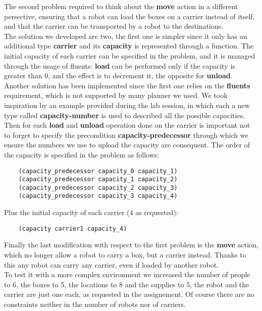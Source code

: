The second problem required to think about the \textbf{move} action in a different persective, 
ensuring that a robot can load the boxes on a carrier instead of itself, and that the carrier can be transported by a robot to the destinations.\\
The solution we developed are two, the first one is simpler since it only has an additional type \textbf{carrier} and its \textbf{capacity} is represented through a function.
The initial capacity of each carrier can be specified in the problem, and it is managed through the usage of fluents: \textbf{load} can be performed only if the capacity is greater than 0, and the effect is to decrement it, the opposite for \textbf{unload}.\\
Another solution has been implemented since the first one relies on the \textbf{fluents} requirement, which is not supported by many planner we used.
We took inspiration by an example provided during the lab session, in which each a new type called \textbf{capacity-number} is used to described all the possible capacities.
Then for each \textbf{load} and \textbf{unload} operation done on the carrier is important not to forget to specify the precondition \textbf{capacity-predecessor} through which we ensure the numbers we use to upload the capacity are consequent.
The order of the capacity is specified in the problem as follows:
\begin{verbatim}
    (capacity_predecessor capacity_0 capacity_1)
    (capacity_predecessor capacity_1 capacity_2)
    (capacity_predecessor capacity_2 capacity_3)
    (capacity_predecessor capacity_3 capacity_4)
\end{verbatim}
Plus the initial capacity of each carrier (4 as requested):
\begin{verbatim}
    (capacity carrier1 capacity_4)
\end{verbatim}
Finally the last modification with respect to the first problem is the \textbf{move} action, which no longer allow a robot to carry a box, but a carrier instead.
Thanks to this any robot can carry any carrier, even if loaded by another robot.\\
To test it with a more complex environment we increased the number of people to 6, the boxes to 5, the locations to 8 and the supplies to 5, the robot and the carrier are just one each, as requested in the assignement.
Of course there are no constraints neither in the number of robots nor of carriers.
